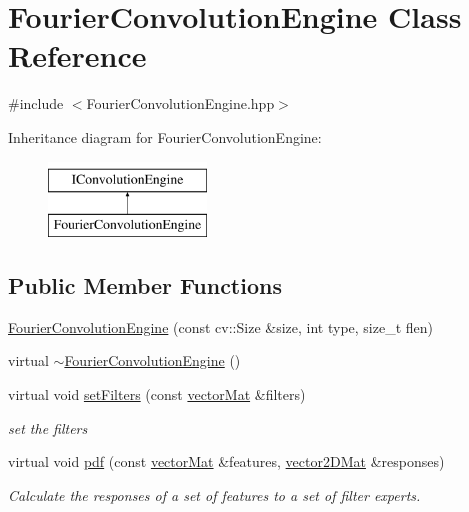 \hypertarget{classFourierConvolutionEngine}{\section{\-Fourier\-Convolution\-Engine \-Class \-Reference}
\label{classFourierConvolutionEngine}
}


{\ttfamily \#include $<$\-Fourier\-Convolution\-Engine.\-hpp$>$}

\-Inheritance diagram for \-Fourier\-Convolution\-Engine\-:\begin{figure}[H]
\begin{center}
\leavevmode
\includegraphics[height=2.000000cm]{classFourierConvolutionEngine}
\end{center}
\end{figure}
\subsection*{\-Public \-Member \-Functions}
\begin{DoxyCompactItemize}
\item 
\hyperlink{classFourierConvolutionEngine_a30d60a44b5767b43a4042171cf813fcd}{\-Fourier\-Convolution\-Engine} (const cv\-::\-Size \&size, int type, size\-\_\-t flen)
\item 
virtual \hyperlink{classFourierConvolutionEngine_a827dafdecfbb07891fbeee998af60236}{$\sim$\-Fourier\-Convolution\-Engine} ()
\item 
virtual void \hyperlink{classFourierConvolutionEngine_ad895979797d38a7c97e8dfcca9571fd2}{set\-Filters} (const \hyperlink{types_8hpp_a3207a7addcfa415d1c83622febcb1e9b}{vector\-Mat} \&filters)
\begin{DoxyCompactList}\small\item\em set the filters \end{DoxyCompactList}\item 
virtual void \hyperlink{classFourierConvolutionEngine_a30e84c8f67a198d318780e247efbbe41}{pdf} (const \hyperlink{types_8hpp_a3207a7addcfa415d1c83622febcb1e9b}{vector\-Mat} \&features, \hyperlink{types_8hpp_a33cacb85be7b8df3dc0b67d5d849f4cc}{vector2\-D\-Mat} \&responses)
\begin{DoxyCompactList}\small\item\em \-Calculate the responses of a set of features to a set of filter experts. \end{DoxyCompactList}\end{DoxyCompactItemize}
